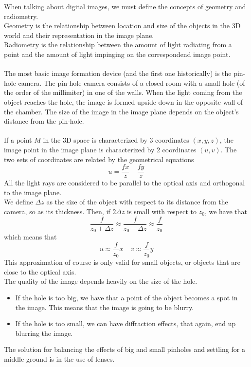 When talking about digital images, we must define the concepts of geometry and radiometry. \\
Geometry is the relationship between location and size of the objects in the 3D world and their representation in the image plane. \\
Radiometry is the relationship between the amount of light radiating from a point and the amount of light impinging on the correspondend image point. \\ \\
The most basic image formation device (and the first one historically) is the pin-hole camera. The pin-hole camera consists of a closed room with a small hole (of the order of the millimiter) in one of the walls. When the light coming from the object reaches the hole, the image is formed upside down in the opposite wall of the chamber. The size of the image in the image plane depends on the object's distance from the pin-hole. \\ \\ 
If a point $M$ in the 3D space is characterized by 3 coordinates $(x,y,z)$, the image point in the image plane is characterized by 2 coordinates $(u,v)$. The two sets of coordinates are related by the geometrical equations
$$
	u = \frac{fx}{z} \ \ \ \ \ \frac{fy}{z}
$$
All the light rays are considered to be parallel to the optical axis and orthogonal to the image plane. \\
We define $\Delta z$ as the size of the object with respect to its distance from the camera, so as its thickness. Then, if $2\Delta z$ is small with respect to $z_0$, we have that
$$
	\frac{f}{z_0 + \Delta z} \approx \frac{f}{z_0-\Delta z} \approx \frac{f}{z_0}
$$
which means that
$$
	u\approx \frac{f}{z_0}x \ \ \ \ \ v \approx \frac{f}{z_0}y
$$
This approximation of course is only valid for small objects, or objects that are close to the optical axis. \\
The quality of the image depends heavily on the size of the hole. 
\begin{itemize}
	\item If the hole is too big, we have that a point of the object becomes a spot in the image. This means that the image is going to be blurry. 
	\item If the hole is too small, we can have diffraction effects, that again, end up blurring the image.
\end{itemize}
The solution for balancing the effects of big and small pinholes and settling for a middle ground is in the use of lenses. \\ \\
